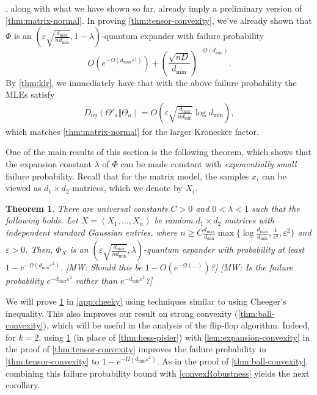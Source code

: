 \documentclass[aos]{imsart}
\newtheorem{theorem}{Theorem}[section]
\theoremstyle{definition}
\numberwithin{equation}{section}
\newcommand{\eps}{\varepsilon}
\newcommand{\Dop}{D_{\operatorname{op}}}
\def\dmin{d_{\min}}
\def\dmax{d_{\max}}
\newcommand{\MW}[1]{{\color{red}[MW: #1]}}
\newcommand{\MW}[1]{{}}
\begin{document}
, along with what we have shown so far, already imply a preliminary version of \cref{thm:matrix-normal}.
In proving \cref{thm:tensor-convexity}, we've already shown that $\Phi$ is an $(\eps \sqrt{\frac{\dmax}{n d_{\min}}}, 1 - \lambda)$-quantum expander with failure probability
\[ O(e^{ - \Omega( \dmax \eps^2)}) + \left( \frac{\sqrt{nD}}{d_{\min}} \right)^{ - \Omega(d_{\min})}. \]
By \cref{thm:klr}, we immediately have that with the above failure probability the MLEs satisfy
\begin{align*}
  \Dop(\Theta'_a \Vert \Theta_a) = O\left(\eps \sqrt{\frac{\dmax}{n d_{\min}}} \log d_{\min}\right),
\end{align*}
which matches \cref{thm:matrix-normal} for the larger Kronecker factor.

One of the main results of this section is the following theorem, which shows that the expansion constant $\lambda$ of $\Phi$ can be made constant with \emph{exponentially small} failure probability.
Recall that for the matrix model, the samples $x_i$ can be viewed as $d_1 \times d_2$-matrices, which we denote by $X_i$.

\begin{theorem}\label{thm:operator-cheeger}
There are universal constants $C > 0$ and $0<\lambda<1$ such that the following holds.
Let $X=(X_1,\dots,X_n)$ be random $d_1 \times d_2$ matrices with independent standard Gaussian entries, where $n \geq C \frac{\dmax}{d_{\min}} \max\{\log \frac{\dmax}{\dmin}, \frac1{\eps^2}, \eps^2 \}$ and $\eps>0$.
Then, $\Phi_X$ is an $(\eps \sqrt{\frac{\dmax}{n d_{\min}}}, \lambda)$-quantum expander with probability at least $1 - e^{ - \Omega( d_{\min} \eps^2)}$.
\MW{Should this be $1 - O(e^{-\Omega(\ldots)})$?}
\MW{Is the failure probability $e^{-d_{\max}\eps^2}$ rather than $e^{-d_{\min}\eps^2}$?}
\end{theorem}

We will prove \cref{thm:operator-cheeger} in \cref{app:cheeky} using techniques similar to \cite{FM20} using Cheeger's inequality.
This also improves our result on strong convexity (\cref{thm:ball-convexity}), which will be useful in the analysis of the flip-flop algorithm. Indeed, for $k = 2$, using \cref{thm:operator-cheeger} (in place of \cref{thm:hess-pisier}) with \cref{lem:expansion-convexity} in the proof of \cref{thm:tensor-convexity} improves the failure probability in \cref{thm:tensor-convexity} to $1 - e^{ - \Omega( d_{\min} \eps^2)}$. As in the proof of \cref{thm:ball-convexity}, combining this failure probability bound with \cref{convexRobustness} yields the next corollary.
\end{document}
